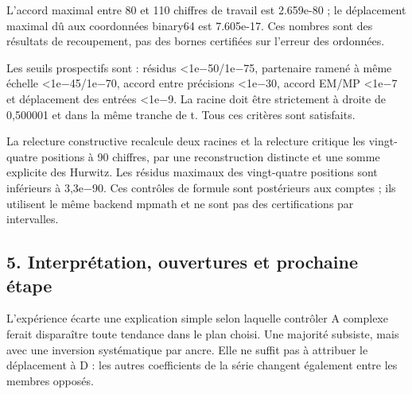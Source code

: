 \documentclass[
  10pt,
  a4paper,
]{article}
\begin{document}
L'accord maximal entre 80 et 110 chiffres de travail est 2.659e-80 ; le
déplacement maximal dû aux coordonnées binary64 est 7.605e-17. Ces
nombres sont des résultats de recoupement, pas des bornes certifiées sur
l'erreur des ordonnées.

Les seuils prospectifs sont : résidus \textless1e−50/1e−75, partenaire
ramené à même échelle \textless1e−45/1e−70, accord entre précisions
\textless1e−30, accord EM/MP \textless1e−7 et déplacement des entrées
\textless1e−9. La racine doit être strictement à droite de 0,500001 et
dans la même tranche de \textbar t\textbar. Tous ces critères sont
satisfaits.

La relecture constructive recalcule deux racines et la relecture
critique les vingt-quatre positions à 90 chiffres, par une
reconstruction distincte et une somme explicite des Hurwitz. Les résidus
maximaux des vingt-quatre positions sont inférieurs à 3,3e−90. Ces
contrôles de formule sont postérieurs aux comptes ; ils utilisent le
même backend mpmath et ne sont pas des certifications par intervalles.

\newpage

\hypertarget{interpruxe9tation-ouvertures-et-prochaine-uxe9tape}{%
\subsection{5. Interprétation, ouvertures et prochaine
étape}\label{interpruxe9tation-ouvertures-et-prochaine-uxe9tape}}

L'expérience écarte une explication simple selon laquelle contrôler A
complexe ferait disparaître toute tendance dans le plan choisi. Une
majorité subsiste, mais avec une inversion systématique par ancre. Elle
ne suffit pas à attribuer le déplacement à D : les autres coefficients
de la série changent également entre les membres opposés.
\end{document}
